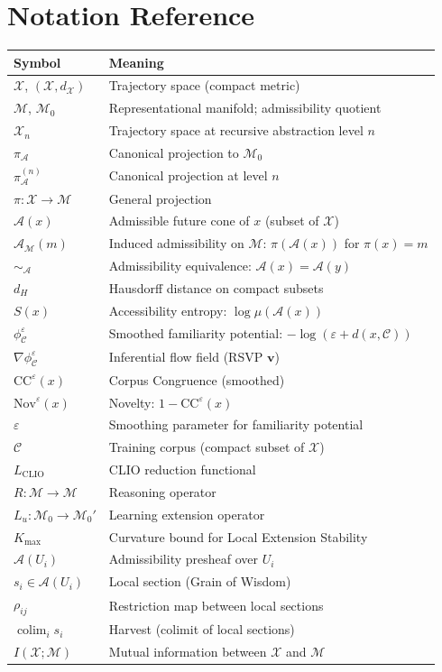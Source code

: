 \documentclass[12pt, a4paper, oneside]{book}
\newcommand{\Adm}{\mathcal{A}}
\newcommand{\X}{\mathcal{X}}
\newcommand{\M}{\mathcal{M}}
\newcommand{\C}{\mathcal{C}}
\newcommand{\proj}{\pi}
\newcommand{\projA}{\pi_{\!\Adm}}
\newcommand{\dH}{d_H}
\newcommand{\SA}{{\sim_{\!\Adm}}}
\newcommand{\Nov}{\mathrm{Nov}}
\newcommand{\CC}{\mathrm{CC}}
\newcommand{\Ent}{S}
\newcommand{\phiCe}{\phi_{\C}^{\varepsilon}}
\newcommand{\vel}{\mathbf{v}}
\DeclareMathOperator{\colim}{colim}
\begin{document}
\chapter{Notation Reference}
\label{app:notation}

\begin{center}
\begin{tabular}{lp{}}
\toprule
Symbol & Meaning \\
\midrule
$\X$, $(\X, d_\X)$ & Trajectory space (compact metric) \\
$\M$, $\M_0$ & Representational manifold; admissibility quotient \\
$\X_n$ & Trajectory space at recursive abstraction level $n$ \\
$\projA$ & Canonical projection to $\M_0$ \\
$\projA^{(n)}$ & Canonical projection at level $n$ \\
$\proj : \X \to \M$ & General projection \\
$\Adm(x)$ & Admissible future cone of $x$ (subset of $\X$) \\
$\Adm_\M(m)$ & Induced admissibility on $\M$: $\proj(\Adm(x))$ for $\proj(x)=m$ \\
$\SA$ & Admissibility equivalence: $\Adm(x) = \Adm(y)$ \\
$\dH$ & Hausdorff distance on compact subsets \\
$\Ent(x)$ & Accessibility entropy: $\log \mu(\Adm(x))$ \\
$\phiCe$ & Smoothed familiarity potential: $-\log(\varepsilon + d(x,\C))$ \\
$\nabla \phiCe$ & Inferential flow field (RSVP $\vel$) \\
$\CC^\varepsilon(x)$ & Corpus Congruence (smoothed) \\
$\Nov^\varepsilon(x)$ & Novelty: $1 - \CC^\varepsilon(x)$ \\
$\varepsilon$ & Smoothing parameter for familiarity potential \\
$\C$ & Training corpus (compact subset of $\X$) \\
$L_{\mathrm{CLIO}}$ & CLIO reduction functional \\
$R : \M \to \M$ & Reasoning operator \\
$L_u : \M_0 \to \M_0'$ & Learning extension operator \\
$K_{\max}$ & Curvature bound for Local Extension Stability \\
$\mathscr{A}(U_i)$ & Admissibility presheaf over $U_i$ \\
$s_i \in \mathscr{A}(U_i)$ & Local section (Grain of Wisdom) \\
$\rho_{ij}$ & Restriction map between local sections \\
$\colim_i s_i$ & Harvest (colimit of local sections) \\
$I(\X;\M)$ & Mutual information between $\X$ and $\M$ \\
\bottomrule
\end{tabular}
\end{center}
\end{document}

